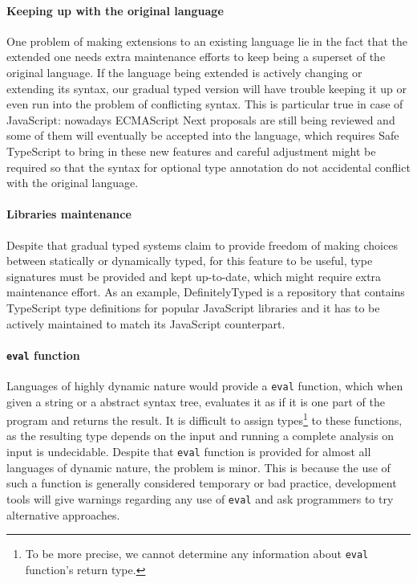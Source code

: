 \paragraph{Keeping up with the original language}
One problem of making extensions to an existing language
lie in the fact that the extended one needs extra maintenance efforts to keep being
a superset of the original language.
If the language being extended is actively changing or extending its syntax,
our gradual typed version will have trouble keeping it up or
even run into the problem of conflicting syntax.
This is particular true in case of JavaScript: nowadays ECMAScript Next
proposals are still being reviewed and some of them will eventually
be accepted into the language,
which requires Safe TypeScript to bring in these new features
and careful adjustment might be required so that the syntax for
optional type annotation do not accidental conflict with the original language.

\paragraph{Libraries maintenance}
Despite that gradual typed systems claim to provide freedom of making choices
between statically or dynamically typed,
for this feature to be useful, type signatures must be provided
and kept up-to-date, which might require extra maintenance effort.
As an example, DefinitelyTyped\cite{yankov2014definitelytyped}
is a repository that contains TypeScript type definitions for popular
JavaScript libraries and it has to be actively maintained to
match its JavaScript counterpart.

\paragraph{\texttt{eval} function}

Languages of highly dynamic nature would provide a \texttt{eval} function,
which when given a string or a abstract syntax tree, evaluates it as
if it is one part of the program and returns the result.
It is difficult to assign types\footnote{To be more precise,
we cannot determine any information about \texttt{eval} function's return type.
} to these functions, as
the resulting type depends on the input and running
a complete analysis on input is undecidable.
Despite that \texttt{eval} function is provided
for almost all languages of dynamic nature, the problem is minor.
This is because the use of such a function is generally considered
temporary or bad practice, development tools will give warnings
regarding any use of \texttt{eval} and ask programmers to try alternative approaches.

